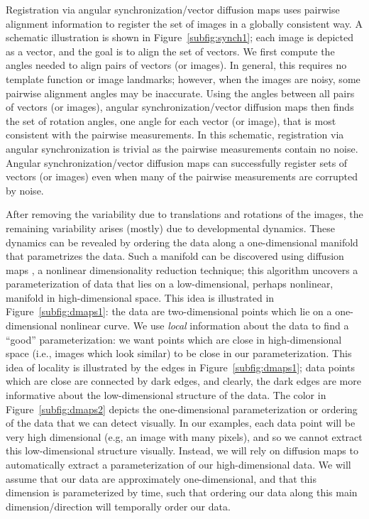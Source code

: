 \documentclass{pnastwo}
\begin{document}
\begin{article}
Registration via angular synchronization/vector diffusion maps uses pairwise alignment information to register the set of images in a globally consistent way.
%
A schematic illustration is shown in Figure~\ref{subfig:synch1}; each image is depicted as a vector, and the goal is to align the set of vectors. 
%
We first compute the angles needed to align pairs of vectors (or images).
%
In general, this requires no template function or image landmarks; however, when the images are noisy, some pairwise alignment angles may be inaccurate.
%
Using the angles between all pairs of vectors (or images), angular synchronization/vector diffusion maps then finds the set of rotation angles, one angle for each vector (or image), that is most consistent with the pairwise measurements. 
%
In this schematic, registration via angular synchronization is trivial as the pairwise measurements contain no noise. 
%
Angular synchronization/vector diffusion maps can successfully register sets of vectors (or images) even when many of the pairwise measurements are corrupted by noise. 
%

%
After removing the variability due to translations and rotations of the images, the remaining variability arises (mostly) due to developmental dynamics.
% 
These dynamics can be revealed by ordering the data along a one-dimensional manifold that parametrizes the data. 
%
Such a manifold can be discovered using diffusion maps \cite{coifman2005geometric}, a nonlinear dimensionality reduction technique;
this algorithm uncovers a parameterization of data that lies on a low-dimensional, perhaps nonlinear, manifold in high-dimensional space. 
%
This idea is illustrated in Figure~\ref{subfig:dmaps1}: the data are two-dimensional points which lie on a one-dimensional nonlinear curve. 
%
We use {\it local} information about the data to find a ``good'' parameterization: we want points which are close in high-dimensional space (i.e., images which look similar) to be close in our parameterization.
%
This idea of locality is illustrated by the edges in Figure~\ref{subfig:dmaps1}; data points which are close are connected by dark edges, and clearly, the dark edges are more informative about the low-dimensional structure of the data. 
%
The color in Figure~\ref{subfig:dmaps2} depicts the one-dimensional parameterization or ordering of the data that we can detect visually.
%
In our examples, each data point will be very high dimensional (e.g, an image with many pixels), and so we cannot extract this low-dimensional structure visually.
%
Instead, we will rely on diffusion maps to automatically extract a parameterization of our high-dimensional data.
%
We will assume that our data are approximately one-dimensional, and that this dimension is parameterized by time, such that ordering our data along this main dimension/direction will temporally order our data. 


\end{article}
\end{document}
